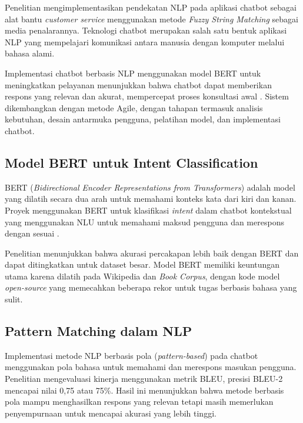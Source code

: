 Penelitian \textcite{mulyatun2021pendekatan} mengimplementasikan pendekatan NLP pada aplikasi chatbot sebagai alat bantu \textit{customer service} menggunakan metode \textit{Fuzzy String Matching} sebagai media penalarannya. Teknologi chatbot merupakan salah satu bentuk aplikasi NLP yang mempelajari komunikasi antara manusia dengan komputer melalui bahasa alami.

Implementasi chatbot berbasis NLP menggunakan model BERT untuk meningkatkan pelayanan menunjukkan bahwa chatbot dapat memberikan respons yang relevan dan akurat, mempercepat proses konsultasi awal \parencite{ibadurrahman2025implementasi}. Sistem dikembangkan dengan metode Agile, dengan tahapan termasuk analisis kebutuhan, desain antarmuka pengguna, pelatihan model, dan implementasi chatbot.

\subsection{Model BERT untuk Intent Classification}

BERT (\textit{Bidirectional Encoder Representations from Transformers}) adalah model yang dilatih secara dua arah untuk memahami konteks kata dari kiri dan kanan. Proyek menggunakan BERT untuk klasifikasi \textit{intent} dalam chatbot kontekstual yang menggunakan NLU untuk memahami maksud pengguna dan merespons dengan sesuai \parencite{vasist2021intent}.

Penelitian \textcite{vasist2021intent} menunjukkan bahwa akurasi percakapan lebih baik dengan BERT dan dapat ditingkatkan untuk dataset besar. Model BERT memiliki keuntungan utama karena dilatih pada Wikipedia dan \textit{Book Corpus}, dengan kode model \textit{open-source} yang memecahkan beberapa rekor untuk tugas berbasis bahasa yang sulit.

\subsection{Pattern Matching dalam NLP}

Implementasi metode NLP berbasis pola (\textit{pattern-based}) pada chatbot menggunakan pola bahasa untuk memahami dan merespons masukan pengguna. Penelitian \textcite{rahayu2024implementation} mengevaluasi kinerja menggunakan metrik BLEU, presisi BLEU-2 mencapai nilai 0,75 atau 75\%. Hasil ini menunjukkan bahwa metode berbasis pola mampu menghasilkan respons yang relevan tetapi masih memerlukan penyempurnaan untuk mencapai akurasi yang lebih tinggi.

